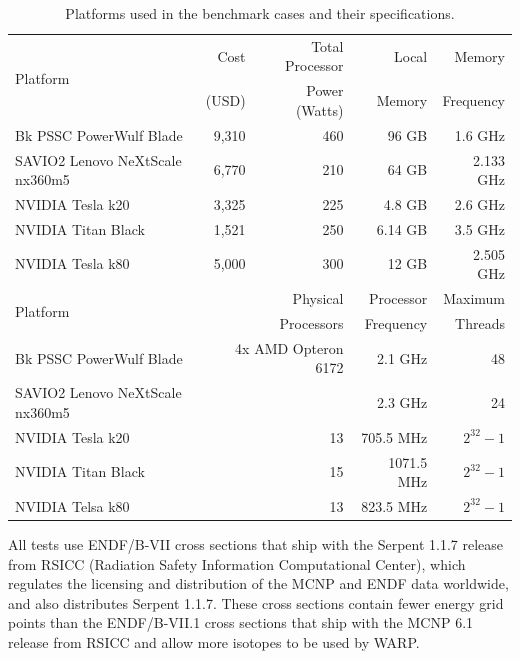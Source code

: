 \documentclass[preprint,12pt]{elsarticle}
\begin{document}
\begin{table}[h]
\centering
\caption{Platforms used in the benchmark cases and their specifications.}
\label{platform_table}
\small
\begin{tabular}{| l | r | r | r | r |}
\hline
\multirow{2}{*}{Platform} &  Cost   &Total Processor  & Local       & Memory     \\
                                       & (USD)  & Power (Watts) & Memory  & Frequency \\
\hline
Bk PSSC PowerWulf Blade       &    9,310   & 460 &  96 GB        &  1.6 GHz                    \\
\hline
SAVIO2 Lenovo NeXtScale nx360m5       &   6,770    &  210  &  64 GB        & 2.133  GHz                    \\
\hline
NVIDIA Tesla k20         &    3,325     & 225 &  4.8  GB      &  2.6 GHz                  \\
\hline
NVIDIA Titan Black       &    1,521   & 250 &  6.14 GB        & 3.5 GHz              \\
\hline
NVIDIA Tesla k80       &    5,000    & 300 &  12 GB        &  2.505 GHz              \\
\hline
\hline
\hline
\multirow{2}{*}{Platform}  &  \multicolumn{2}{r|}{Physical }     & Processor  & Maximum \\
                                        & \multicolumn{2}{r|}{Processors}  & Frequency  & Threads \\
\hline
Bk PSSC PowerWulf Blade       &   \multicolumn{2}{r|}{4x AMD Opteron 6172 }  &  2.1 GHz     &  48           \\
\hline
SAVIO2 Lenovo NeXtScale nx360m5   &   \multicolumn{2}{r|}{ }  &  2.3 GHz     &  24           \\
\hline
NVIDIA Tesla k20         &       \multicolumn{2}{r|}{13}   &  705.5 MHz     &  $2^{32}-1$           \\
\hline
NVIDIA Titan Black       &      \multicolumn{2}{r|}{ 15 }  &  1071.5 MHz     & $2^{32}-1$           \\
\hline
NVIDIA Telsa k80      &      \multicolumn{2}{r|}{ 13 }  &  823.5 MHz     & $2^{32}-1$           \\
\hline

\end{tabular}
\end{table}

All tests use ENDF/B-VII cross sections that ship with the Serpent 1.1.7 release from RSICC (Radiation Safety Information Computational Center), which regulates the licensing and distribution of the MCNP and ENDF data worldwide, and also distributes Serpent 1.1.7.  These cross sections contain fewer energy grid points than the ENDF/B-VII.1 cross sections that ship with the MCNP 6.1 release from RSICC and allow more isotopes to be used by WARP.%
\end{document}
